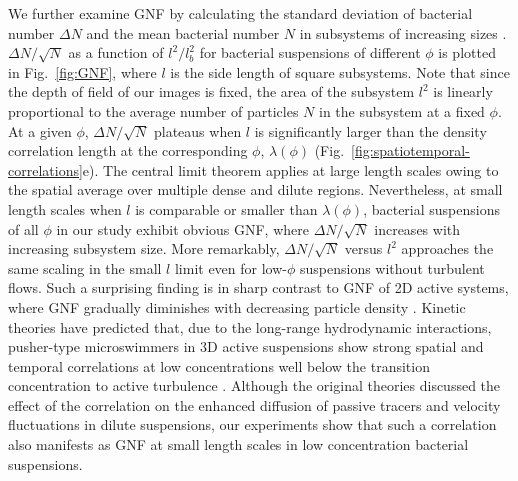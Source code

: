 \documentclass[twocolumn,aps,prx,amsmath,amssymb,longbibliography]{revtex4-2}
\begin{document}
We further examine GNF by calculating the standard deviation of bacterial number $\Delta N$ and the mean bacterial number $N$ in subsystems of increasing sizes \cite{Liu2020}. $\Delta N / \sqrt N$ as a function of $l^2/l_b^2$ for bacterial suspensions of different $\phi$ is plotted in Fig.~\ref{fig:GNF}, where $l$ is the side length of square subsystems. Note that since the depth of field of our images is fixed, the area of the subsystem $l^2$ is linearly proportional to the average number of particles $N$ in the subsystem at a fixed $\phi$. At a given $\phi$, $\Delta N/\sqrt N$ plateaus when $l$ is significantly larger than the density correlation length at the corresponding $\phi$, $\lambda(\phi)$ (Fig.~\ref{fig:spatiotemporal-correlations}e). The central limit theorem applies at large length scales owing to the spatial average over multiple dense and dilute regions. Nevertheless, at small length scales when $l$ is comparable or smaller than $\lambda(\phi)$, bacterial suspensions of all $\phi$ in our study exhibit obvious GNF, where $\Delta N/\sqrt N$ increases with increasing subsystem size. More remarkably, $\Delta N/\sqrt N$ versus $l^2$ approaches the same scaling in the small $l$ limit even for low-$\phi$ suspensions without turbulent flows. Such a surprising finding is in sharp contrast to GNF of 2D active systems, where GNF gradually diminishes with decreasing particle density \cite{Narayan2007,Aranson2008,Kudrolli2008,Deseigne2010,Zhang2010,Schaller2013}. Kinetic theories have predicted that, due to the long-range hydrodynamic interactions, pusher-type microswimmers in 3D active suspensions show strong spatial and temporal correlations at low concentrations well below the transition concentration to active turbulence \cite{Stenhammar2017,Nambiar2021}. Although the original theories discussed the effect of the correlation on the enhanced diffusion of passive tracers and velocity fluctuations in dilute suspensions, our experiments show that such a correlation also manifests as GNF at small length scales in low concentration bacterial suspensions.
\end{document}
